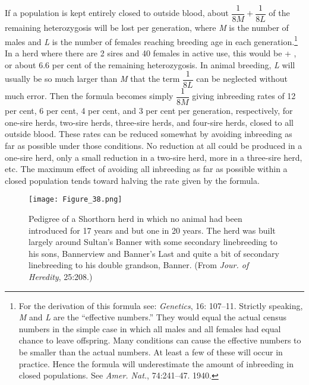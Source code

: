 If a population is kept entirely closed to outside blood, about
\(\dfrac{1}{8M} + \dfrac{1}{8L}\) of the remaining heterozygosis will
be lost per generation, where \textit{M} is the number of males and
\textit{L} is the number of females reaching breeding age in each
generation.\footnote{For the derivation of this formula see: \textit{Genetics},
16: 107--11. Strictly speaking, \textit{M}
and \textit{L} are the ``effective numbers.'' They would equal the actual census numbers in
the simple case in which all males and all females had equal chance to leave offspring.
Many conditions can cause the effective numbers to be smaller than the actual
numbers. At least a few of these will occur in practice. Hence the formula will
underestimate the amount of inbreeding in closed populations. See \textit{Amer. Nat.}, 74:241--47. 1940.} In a herd where there are 2 sires
and 40 females in active use, this would be  + , or about 6.6
per cent of the remaining heterozygosis. In animal breeding, \textit{L} will
usually be so much larger than \textit{M} that the term $\dfrac{1}{8L}$ can be neglected
without much error. Then the formula becomes simply $\dfrac{1}{8M}$ giving
inbreeding rates of 12 per cent, 6 per cent, 4 per cent, and 3 per cent per
generation, respectively, for one-sire herds, two-sire herds, three-sire
herds, and four-sire herds, closed to all outside blood. These rates can
be reduced somewhat by avoiding inbreeding as far as possible under
those conditions. No reduction at all could be produced in a one-sire
herd, only a small reduction in a two-sire herd, more in a three-sire
herd, etc. The maximum effect of avoiding all inbreeding as far as possible
within a closed population tends toward halving the rate given by
the formula.

\begin{figure}
	\centering
    \texttt{[image: Figure\_38.png]}
    \caption{Pedigree of a Shorthorn herd in which no animal had been introduced for 17 years and but 
    		 one in 20 years. The herd was built largely around Sultan's Banner with some secondary 
    		 linebreeding to his sons, Bannerview and Banner's Last and quite a bit of
			 secondary linebreeding to his double grandson, Banner. (From \textit{Jour. of Heredity}, 
			 25:208.)}
    \label{fig:Lush_Figure_38}
\end{figure}

